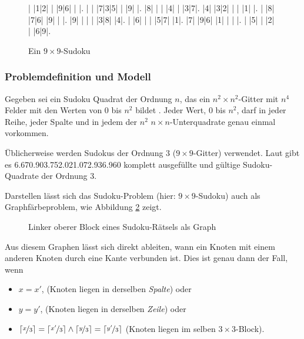 \begin{figure}[hp]
	\begin{sudoku}
	| |1|2| | |9|6| | |.
	| | |7|3|5| | |9| |.
	|8| | | |4| | |3|7|.
	|4| |3|2| | | |1| |.
	| |8| |7|6| |9| | |.
	|9| | | | |3|8| |4|.
	| |6| | | |5|7| |1|.
	|7| |9|6| |1| | | |.
	| |5| | |2| | |6|9|.
	\end{sudoku}
  \caption{Ein $9 \times 9$-Sudoku}
  \label{fig:sudoku-beispiel}
\end{figure}

\subsubsection{Problemdefinition und Modell}

Gegeben sei ein Sudoku Quadrat der Ordnung $n$, das ein $n^2 \times n^2$-Gitter 
mit $n^4$ Felder mit den Werten von $0$ bis $n^2$ bildet 
\cite{sudoku-as-constraint}. Jeder Wert, $0$ bis $n^2$, darf in jeder Reihe, 
jeder Spalte und in jedem der $n^2$ $n \times n$-Unterquadrate genau einmal 
vorkommen.

Üblicherweise werden Sudokus der Ordnung $3$ ($9 \times 9$-Gitter) verwendet.
Laut \cite{sudoku-as-constraint} gibt es 6.670.903.752.021.072.936.960 komplett
ausgefüllte und gültige Sudoku-Quadrate der Ordnung $3$.


Darstellen lässt sich das Sudoku-Problem (hier: $9 \times 9$-Sudoku) auch als
Graphfärbeproblem, wie Abbildung \ref{fig:sudoku-graph} zeigt.

\begin{figure}
  \centering
  \def\JPicScale{0.5}
  
  \caption{Linker oberer Block eines Sudoku-Rätsels als Graph}
  \label{fig:sudoku-graph}
\end{figure}

Aus diesem Graphen lässt sich direkt ableiten, wann ein Knoten mit einem anderen
Knoten durch eine Kante verbunden ist. Dies ist genau dann der Fall, wenn

\begin{itemize}
  \item $x = x'$, (Knoten liegen in derselben \textsl{Spalte}) oder
  \item $y = y'$, (Knoten liegen in derselben \textsl{Zeile}) oder
  \item $\left\lceil \nicefrac{x}{3} \right\rceil = \left\lceil
  \nicefrac{x'}{3} \right\rceil \wedge \left\lceil \nicefrac{y}{3} \right\rceil
  = \left\lceil \nicefrac{y'}{3} \right\rceil$ (Knoten liegen im selben
  $3 \times 3$-Block).
\end{itemize}

